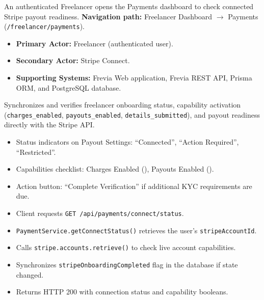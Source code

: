 An authenticated Freelancer opens the Payments dashboard to check connected Stripe payout readiness.\newline
\textbf{Navigation path:} Freelancer Dashboard $\rightarrow$ Payments (\texttt{/freelancer/payments}).


\begin{itemize}[leftmargin=1.6em,topsep=3pt,itemsep=2pt,parsep=0pt,label=$\bullet$]
      \item \textbf{Primary Actor:} Freelancer (authenticated user).
      \item \textbf{Secondary Actor:} Stripe Connect.
      \item \textbf{Supporting Systems:} Frevia Web application, Frevia REST API, Prisma ORM, and PostgreSQL database.
\end{itemize}

\noindent Synchronizes and verifies freelancer onboarding status, capability activation (\texttt{charges\_enabled}, \texttt{payouts\_enabled}, \texttt{details\_submitted}), and payout readiness directly with the Stripe API.

\begin{itemize}[leftmargin=1.6em,topsep=3pt,itemsep=2pt,parsep=0pt,label=$\bullet$]
      \item Status indicators on Payout Settings: ``Connected'', ``Action Required'', ``Restricted''.
      \item Capabilities checklist: Charges Enabled (\checkmark), Payouts Enabled (\checkmark).
      \item Action button: ``Complete Verification'' if additional KYC requirements are due.
\end{itemize}

\begin{itemize}[leftmargin=1.6em,topsep=3pt,itemsep=2pt,parsep=0pt,label=$\bullet$]
      \item Client requests \texttt{GET /api/payments/connect/status}.
      \item \texttt{PaymentService.getConnectStatus()} retrieves the user's \texttt{stripeAccountId}.
      \item Calls \texttt{stripe.accounts.retrieve()} to check live account capabilities.
      \item Synchronizes \texttt{stripeOnboardingCompleted} flag in the database if state changed.
      \item Returns HTTP 200 with connection status and capability booleans.
\end{itemize}

